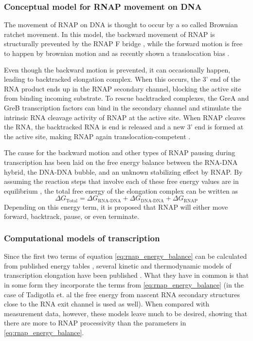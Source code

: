 \subsubsection{Conceptual model for RNAP movement on DNA}
The movement of RNAP on DNA is thought to occur by a so called Brownian ratchet
movement. In this model, the backward movement of RNAP is structurally
prevented by the RNAP F bridge \cite{_ratchet_2005}, while the forward motion
is free to happen by brownian motion and as recently shown a translocation bias
\cite{hein_rna_2011}.

Even though the backward motion is prevented, it can occasionally happen,
leading to backtracked elongation complex. When this occurs, the 3' end of the
RNA product ends up in the RNAP secondary channel, blocking the active site
from binding incoming substrate. To rescue backtracked complexes, the GreA and
GreB transcription factors can bind in the secondary channel and stimulate the
intrinsic RNA cleavage activity of RNAP at the active site. When RNAP cleaves
the RNA, the backtracked RNA is end is released and a new 3' end is formed at
the active site, making RNAP again translocation-competent
\cite{toulme_grea_2000}.

The cause for the backward motion and other types of RNAP pausing during
transcription has been laid on the free energy balance between the RNA-DNA
hybrid, the DNA-DNA bubble, and an unknown stabilizing effect by
RNAP\cite{greive_thinking_2005}. By assuming the reaction steps that involve
each of these free energy values are in equilibrium
\cite{greive_thinking_2005}, the total free energy of the elongation complex
can be written as 
\begin{equation}
	\Delta G_{\text{Total}} = \Delta G_{\text{RNA-DNA}} + \Delta
	G_{\text{DNA-DNA}} + \Delta G_{\text{RNAP}}
	\label{eq:rnap_energy_balance}
\end{equation}
Depending on this energy term, it is proposed that RNAP will either move
forward, backtrack, pause, or even terminate.

\subsubsection{Computational models of transcription}
Since the first two terms of equation \eqref{eq:rnap_energy_balance} can be
calculated from published energy tables \cite{wu_temperature_2002}
\cite{santalucia_thermodynamics_2004}, several kinetic and thermodynamic models
of transcription elongation have been published
\cite{tadigotla_thermodynamic_2006-1} \cite{bai_sequence-dependent_2004}
\cite{guajardo_model_1997}. What they have in common is that in some form they
incorporate the terms from \eqref{eq:rnap_energy_balance} (in the case of
Tadigotla et. al the free energy from nascent RNA secondary structures close
to the RNA exit channel is used as well). When compared with measurement data,
however, these models leave much to be desired, showing that there are more to
RNAP processivity than the parameters in \eqref{eq:rnap_energy_balance}.

